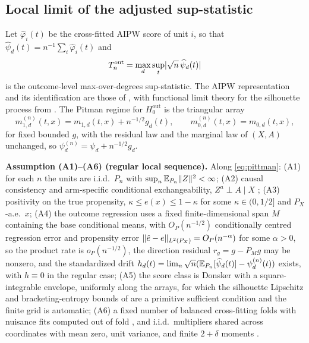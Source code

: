 \subsection{Local limit of the adjusted sup-statistic}
\label{sec:locallimit}

Let $\widehat\varphi_i(t)$ be the cross-fitted AIPW score of unit $i$, so that $\widehat\psi_d(t)=n^{-1}\sum_i\widehat\varphi_i(t)$ and
\begin{equation}
T_n^{\mathrm{out}}=\max_{d}\sup_{t}\lvert \sqrt n\,\widehat\psi_d(t)\rvert
\end{equation}
is the outcome-level max-over-degrees sup-statistic. The AIPW representation and its identification are those of \citet{souto_diamantis_tcda_2026}, with functional limit theory for the silhouette process from \citet{kim_lee_tce_2026}. The Pitman regime for $H_0^{\mathrm{out}}$ is the triangular array
\begin{equation}
m^{(n)}_{1,d}(t,x)=m_{1,d}(t,x)+n^{-1/2}g_d(t),\qquad
m^{(n)}_{0,d}(t,x)=m_{0,d}(t,x),
\label{eq:pittman}
\end{equation}
for fixed bounded $g$, with the residual law and the marginal law of $(X,A)$ unchanged, so $\psi^{(n)}_{d}=\psi_d+n^{-1/2}g_d$.

\noindent\textbf{Assumption (A1)--(A6) (regular local sequence).} Along \eqref{eq:pittman}: (A1) for each $n$ the units are i.i.d.\ $P_n$ with $\sup_n\mathbb{E}_{P_n}\lVert Z\rVert^2<\infty$; (A2) causal consistency and arm-specific conditional exchangeability, $Z^a\perp A\mid X$ \citep{souto_diamantis_tcda_2026}; (A3) positivity on the true propensity, $\kappa\le e(x)\le1-\kappa$ for some $\kappa\in(0,1/2]$ and $P_X$-a.e.\ $x$; (A4) the outcome regression uses a fixed finite-dimensional span $M$ containing the base conditional means, with $O_P(n^{-1/2})$ conditionally centred regression error and propensity error $\lVert \hat e-e\rVert_{L^2(P_X)}=O_P(n^{-\alpha})$ for some $\alpha>0$, so the product rate is $o_P(n^{-1/2})$, the direction residual $r_g=g-P_Mg$ may be nonzero, and the standardized drift $h_d(t)=\lim_n\sqrt n(\mathbb{E}_{P_n}[\widehat\psi_d(t)]-\psi^{(n)}_d(t))$ exists, with $h\equiv0$ in the regular case; (A5) the score class is Donsker with a square-integrable envelope, uniformly along the arrays, for which the silhouette Lipschitz and bracketing-entropy bounds of \citet{kim_lee_tce_2026} are a primitive sufficient condition and the finite grid is automatic; (A6) a fixed number of balanced cross-fitting folds with nuisance fits computed out of fold \citep{chernozhukov_dml_2018,new_robins_2018}, and i.i.d.\ multipliers shared across coordinates with mean zero, unit variance, and finite $2+\delta$ moments \citep{cck_2013}.

